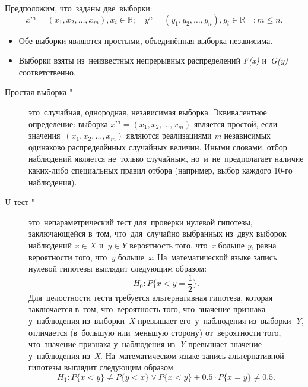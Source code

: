 \documentclass[]{scrartcl}
\begin{document}
Предположим, что~заданы две~выборки:
\begin{equation*}
	x^{m} = (x_{1},x_{2},\ldots,x_{m}), x_{i} \in \mathbb{R};\quad y^{n} = (y_{1},y_{2},\ldots,y_{n}), y_{i} \in \mathbb{R} \quad: m \leq n.
\end{equation*}
 
\begin{itemize}
	\item Обе выборки являются простыми, объединённая выборка независима.
	\item Выборки взяты из~неизвестных непрерывных распределений \textit{F(x)} и~\textit{G(y)} соответственно.
\end{itemize}
 
\begin{description}
	\item[Простая выборка "---] это~случайная, однородная, независимая выборка. Эквивалентное определение: выборка ${\textstyle x^{m} = (x_{1},x_{2},\ldots,x_{m})}$ является простой, если значения~${\textstyle (x_{1},x_{2},\ldots,x_{m})}$ являются реализациями \textit{m} независимых одинаково распределённых случайных величин. Иными словами, отбор наблюдений является не~только случайным, но~и~не~предполагает наличие каких-либо специальных правил отбора (например, выбор каждого 10-го наблюдения).
\end{description}
\begin{description}
	\item[U-тест "---] это~непараметрический тест для~проверки нулевой гипотезы, заключающейся в~том, что~для~случайно выбранных из~двух выборок наблюдений ${\textstyle x \in X}$ и~${\textstyle y \in Y}$ вероятность того, что~\textit{x} больше \textit{y}, равна вероятности того, что~\textit{y} больше~\textit{x}. На~математической языке запись нулевой гипотезы выглядит следующим образом:
	\begin{equation}\label{eq:U-test-null-hypothesis}
	H_{0}:P\{x<y=\frac{1}{2}\}.
	\end{equation}
	Для~целостности теста требуется альтернативная гипотеза, которая заключается в~том, что~вероятность того, что~значение признака у~наблюдения из~выборки~\textit{X} превышает его~у~наблюдения из~выборки~\textit{Y}, отличается (в~большую или~меньшую сторону) от~вероятности того, что~значение признака у~наблюдения из~\textit{Y} превышает значение у~наблюдения из~\textit{X}. На~математическом языке запись альтернативной гипотезы выглядит следующим образом:
	\begin{equation}\label{eq:U-test-alt-hypothesis}
	H_{1}:P\{x<y\} \neq P\{y<x\} \vee P\{x<y\} + 0.5 \cdot P\{x=y\} \neq 0.5.
	\end{equation}
\end{description}
\end{document}
